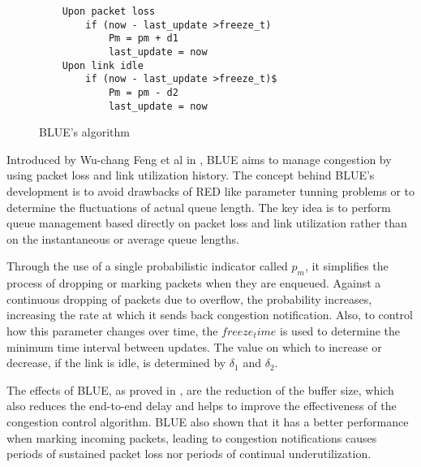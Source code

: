 \begin{wrapfigure}{r}{0.5\textwidth}
    \centering
	\begin{verbatim}
	Upon packet loss
	    if (now - last_update >freeze_t)
	        Pm = pm + d1
	        last_update = now
	Upon link idle
	    if (now - last_update >freeze_t)$
	        Pm = pm - d2
	        last_update = now
  	\end{verbatim}
    \caption{BLUE's algorithm}
    \label{fig:BLUEAlg}
\end{wrapfigure}

Introduced by Wu-chang Feng et al in \cite{FengBLUEAQM}, BLUE aims to manage
congestion by using packet loss and link utilization history. The concept
behind BLUE's development is to avoid drawbacks of RED like parameter tunning
problems or to determine the fluctuations of actual queue length. The key idea
is to perform queue management based directly on packet loss and link
utilization rather than on the instantaneous or average queue lengths.

Through the use of a single probabilistic indicator called $p_m$, it
simplifies the process of dropping or marking packets when they are enqueued.
Against a continuous dropping of packets due to overflow, the probability
increases, increasing the rate at which it sends back congestion notification.
Also, to control how this parameter changes over time, the
$freeze_time$ is used to determine the minimum time interval between
updates.  The value on which to increase or decrease, if the link is idle, is
determined by $\delta_1$ and $\delta_2$.

The effects of BLUE, as proved in \cite{FengBLUEAQM}, are the reduction of the
buffer size, which also reduces the end-to-end delay and helps to improve the
effectiveness of the congestion control algorithm. BLUE also shown that it
has a better performance when marking incoming packets, leading to congestion
notifications causes periods of sustained packet loss nor periods of continual
underutilization.
